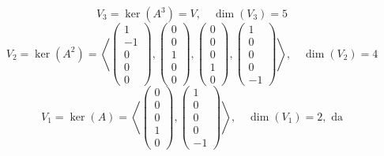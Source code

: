 \documentclass[a4paper,12pt]{article}
\begin{document}
\[
V_3 = \ker(A^3) = V, \quad \dim(V_3) = 5
\]
\[
V_2 = \ker(A^2) = \left\langle
\begin{pmatrix}1\\-1\\0\\0\\0\end{pmatrix},
\begin{pmatrix}0\\0\\1\\0\\0\end{pmatrix},
\begin{pmatrix}0\\0\\0\\1\\0\end{pmatrix},
\begin{pmatrix}1\\0\\0\\0\\-1\end{pmatrix}
\right\rangle, \quad \dim(V_2) = 4
\]
\[
V_1 = \ker(A) = \left\langle
\begin{pmatrix}0\\0\\0\\1\\0\end{pmatrix},
\begin{pmatrix}1\\0\\0\\0\\-1\end{pmatrix}
\right\rangle, \quad \dim(V_1) = 2, \text{ da}
\]
\end{document}
